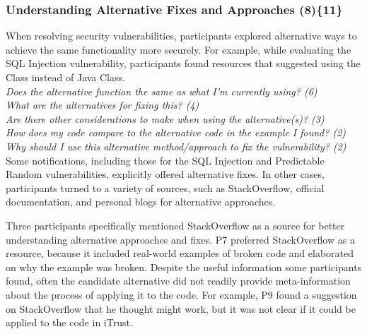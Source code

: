 \documentclass{sig-alternate}
\begin{document}

\subsubsection{\textbf{Understanding Alternative Fixes and Approaches (8)\{11\}}}\label{uafa}

When resolving security vulnerabilities, participants explored alternative ways to achieve the same functionality more securely.
For example, while evaluating the SQL Injection vulnerability, participants found resources that suggested using the  Class instead of Java  Class. 
\\

\noindent\emph{Does the alternative function the same as what I'm currently using? (6)} \\
\emph{What are the alternatives for fixing this? (4)} \\
\emph{Are there other considerations to make when using the alternative(s)? (3)} \\
\emph{How does my code compare to the alternative code in the example I found? (2)} \\
\emph{Why should I use this alternative method/approach to fix the vulnerability? (2)} 
\\
 
Some notifications, including those for the SQL Injection and Predictable Random vulnerabilities, explicitly offered alternative fixes. 
In other cases, participants turned to a variety of sources, such as StackOverflow, official documentation, and personal blogs for alternative approaches.
 
Three participants specifically mentioned StackOverflow as a source for better understanding alternative approaches and fixes. 
P7 preferred StackOverflow as a resource, because it included real-world examples of broken code and elaborated on why the example was broken.
Despite the useful information some participants found, often the candidate alternative did not readily provide meta-information about the process of applying it to the code. 
For example, P9 found a suggestion on StackOverflow that he thought might work, but it was not clear if it could be applied to the code in iTrust.
\end{document}
